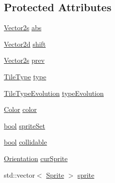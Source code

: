 \subsection*{Protected Attributes}
\begin{DoxyCompactItemize}
\item 
\hyperlink{namespacearcade_a8e527f7400fbff9c38dc31e0a3dd06a1}{Vector2s} \hyperlink{classarcade_1_1_entity_a1ac9b04966209d8ce0fb3a80448e4c24}{abs}
\item 
\hyperlink{namespacearcade_ad7fa150bb74a2e66cb4fa04d6fb79e97}{Vector2d} \hyperlink{classarcade_1_1_entity_a77dc790cc43e3bac252a91ed54de86a2}{shift}
\item 
\hyperlink{namespacearcade_a8e527f7400fbff9c38dc31e0a3dd06a1}{Vector2s} \hyperlink{classarcade_1_1_entity_aa85d7facf49ca0a8dac81672be95c5f0}{prev}
\item 
\hyperlink{namespacearcade_a61ba576694ea309cdf2b4b66902408ca}{Tile\-Type} \hyperlink{classarcade_1_1_entity_ae7c84a1d8dfb2e2581a745f3743409c5}{type}
\item 
\hyperlink{namespacearcade_a2e0a64a64203f78c9efb84a1475a8cf4}{Tile\-Type\-Evolution} \hyperlink{classarcade_1_1_entity_a01a2fd9e95413166c79f680995a9cf3a}{type\-Evolution}
\item 
\hyperlink{unionarcade_1_1_color}{Color} \hyperlink{classarcade_1_1_entity_acaa60759203bf9cdeffb2e3303c7e68e}{color}
\item 
\hyperlink{term__entry_8h_a002004ba5d663f149f6c38064926abac}{bool} \hyperlink{classarcade_1_1_entity_a5aeaf26710a73587ca961cfd1e8879a1}{sprite\-Set}
\item 
\hyperlink{term__entry_8h_a002004ba5d663f149f6c38064926abac}{bool} \hyperlink{classarcade_1_1_entity_ae028e75117e13aa7848672626df867ad}{collidable}
\item 
\hyperlink{namespacearcade_a370755573a2c68e25c59bedd4bce1342}{Orientation} \hyperlink{classarcade_1_1_entity_a680d412f399a7fab4d0a104fd3f7d0bc}{cur\-Sprite}
\item 
std\-::vector$<$ \hyperlink{classarcade_1_1_sprite}{Sprite} $>$ \hyperlink{classarcade_1_1_entity_a609826b1c9d93e8b3aaa9362cb549bad}{sprite}
\end{DoxyCompactItemize}


